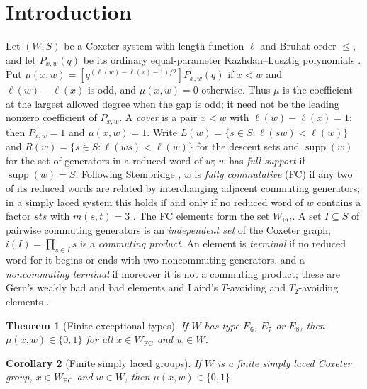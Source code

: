 \documentclass[10pt]{article}
\newtheorem{theorem}{Theorem}[section]
\newtheorem{corollary}[theorem]{Corollary}
\theoremstyle{remark}
\newcommand{\FC}{W_{\mathrm{FC}}}
\newcommand{\supp}{\operatorname{supp}}
\begin{document}
\section{Introduction}\label{sec:intro}
Let $(W,S)$ be a Coxeter system with length function $\ell$ and Bruhat
order $\leq$, and let $P_{x,w}(q)$ be its ordinary equal-parameter
Kazhdan--Lusztig polynomials \cite{KL}. Put
$\mu(x,w)=[q^{(\ell(w)-\ell(x)-1)/2}]P_{x,w}(q)$ if $x<w$ and
$\ell(w)-\ell(x)$ is odd, and $\mu(x,w)=0$ otherwise. Thus $\mu$ is the
coefficient at the largest allowed degree when the gap is odd; it need
not be the leading nonzero coefficient of $P_{x,w}$. A \emph{cover} is a
pair $x<w$ with $\ell(w)-\ell(x)=1$; then $P_{x,w}=1$ and $\mu(x,w)=1$.
Write $L(w)=\{s\in S:\ell(sw)<\ell(w)\}$ and
$R(w)=\{s\in S:\ell(ws)<\ell(w)\}$ for the descent sets and $\supp(w)$
for the set of generators in a reduced word of $w$; $w$ has \emph{full
support} if $\supp(w)=S$. Following Stembridge \cite{Stembridge}, $w$ is
\emph{fully commutative} (FC) if any two of its reduced words are related
by interchanging adjacent commuting generators; in a simply laced system
this holds if and only if no reduced word of $w$ contains a factor $sts$
with $m(s,t)=3$ \cite[Proposition~2.1]{Stembridge}. The FC elements form
the set $\FC$. A set $I\subseteq S$ of pairwise commuting generators is an
\emph{independent set} of the Coxeter graph; $i(I)=\prod_{s\in I}s$ is a
\emph{commuting product}. An element is \emph{terminal} if no reduced word
for it begins or ends with two noncommuting generators, and a
\emph{noncommuting terminal} if moreover it is not a commuting product;
these are Gern's weakly bad and bad elements \cite[Definition~2.1.1]{Gern}
and Laird's $T$-avoiding and $T_2$-avoiding elements \cite[\S2.2]{Laird}.

\begin{theorem}[Finite exceptional types]\label{thm:main}
If $W$ has type $E_6$, $E_7$ or $E_8$, then $\mu(x,w)\in\{0,1\}$ for all
$x\in\FC$ and $w\in W$.
\end{theorem}

\begin{corollary}[Finite simply laced groups]\label{cor:finiteADE}
If $W$ is a finite simply laced Coxeter group, $x\in\FC$ and $w\in W$,
then $\mu(x,w)\in\{0,1\}$.
\end{corollary}
\end{document}

